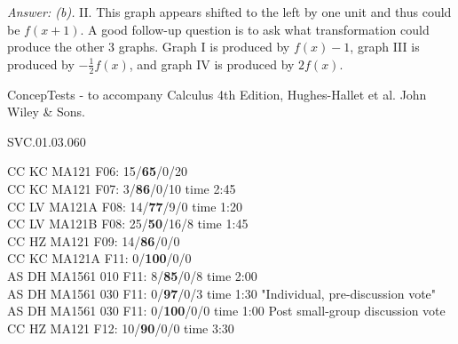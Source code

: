 {\it Answer: (b).} II.  This graph appears shifted to the left by one unit and thus could be $f(x+1)$.  A good follow-up question is to ask what transformation could produce the other 3 graphs.  Graph I is produced by $f(x) - 1$, graph III is produced by $-\frac{1}{2} f(x)$, and graph IV is produced by $2f(x)$.

\medskip
ConcepTests - to accompany Calculus 4th Edition, Hughes-Hallet et al. John Wiley \& Sons.

SVC.01.03.060

CC KC MA121 F06: 15/{\bf 65}/0/20 \\
CC KC MA121 F07: 3/{\bf86}/0/10 time 2:45\\
CC LV MA121A F08: 14/{\bf77}/9/0 time 1:20\\
CC LV MA121B F08: 25/{\bf50}/16/8 time 1:45\\
CC HZ MA121 F09: 14/{\bf86}/0/0  \\
CC KC MA121A F11: 0/{\bf100}/0/0  \\
AS DH MA1561 010 F11: 8/{\bf85}/0/8 time 2:00  \\
AS DH MA1561 030 F11: 0/{\bf97}/0/3 time 1:30 "Individual, pre-discussion vote" \\
AS DH MA1561 030 F11: 0/{\bf100}/0/0 time 1:00 Post small-group discussion vote \\
CC HZ MA121 F12: 10/{\bf90}/0/0 time 3:30  \\
